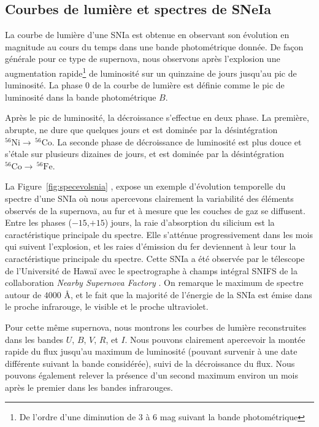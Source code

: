 \documentclass[../main/main.tex]{subfiles}
\begin{document}
\subsection{Courbes de lumière et spectres de SNeIa}

La courbe de lumière d'une SNIa est obtenue en observant son évolution en magnitude au cours du temps
dans une bande photométrique donnée. De façon générale pour ce type de
supernova, nous observons après l'explosion une augmentation rapide\footnote{De
l'ordre d'une diminution de $3$ à $6$ mag suivant la bande photométrique} de
luminosité sur un quinzaine de jours jusqu'au pic de
luminosité. La phase $0$ de la courbe de lumière est définie comme le
pic de luminosité dans la bande photométrique $B$.

Après le pic de luminosité, la décroissance s'effectue en deux phase. La
première, abrupte, ne dure que quelques jours et est dominée par la
désintégration $^{56}\text{Ni}\rightarrow \, ^{56}\text{Co}$. La seconde
phase de décroissance de luminosité est plus douce et s'étale sur
plusieurs dizaines de jours, et est dominée par la désintégration
$^{56}\text{Co}\rightarrow \, ^{56}\text{Fe}$.

La Figure~\ref{fig:specevolsnia} \citep[extraite de][]{Pereira2013}, expose un exemple d'évolution temporelle du spectre
d'une SNIa \citep[SN2011fe, découverte par][]{Nugent2011} où nous
apercevons clairement la variabilité des éléments observés de la
supernova, au fur et à mesure que les couches de gaz se diffusent. Entre les
phases ($-15$,$+15$) jours, la
raie d'absorption du silicium est la caractéristique principale du
spectre. Elle s'atténue progressivement dans les mois qui suivent
l'explosion, et les raies d'émission du fer deviennent à leur tour la caractéristique
principale du spectre. Cette
SNIa a été observée par le télescope de l'Université de Hawaï avec le
spectrographe à champs intégral SNIFS \citep[SuperNova Integrated Field
Spectrograph,][]{SNIFS2004} de la collaboration \textit{Nearby Supernova
  Factory} \citep{Aldering2002}.
On remarque le maximum de spectre autour de $4000$ \AA, et le
fait que la majorité de l'énergie de la SNIa est émise dans le proche
infrarouge, le visible et le proche ultraviolet. 

Pour cette même supernova, nous montrons les courbes de lumière
reconstruites dans les bandes $U$, $B$, $V$, $R$, et $I$. Nous pouvons
clairement apercevoir la montée rapide du flux jusqu'au maximum de
luminosité (pouvant survenir à une date différente suivant la bande
considérée), suivi de la décroissance du flux. Nous pouvons également
relever la présence d'un second maximum environ un mois après le premier
dans les bandes infrarouges.
\end{document}
